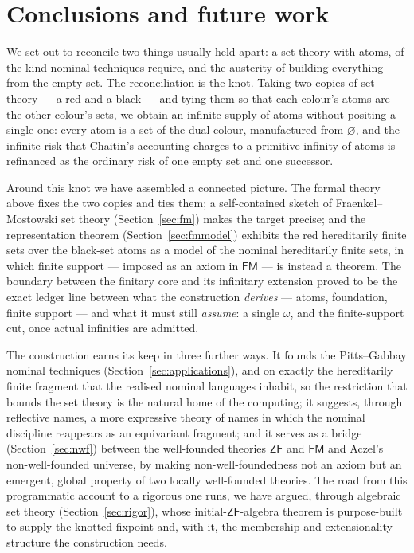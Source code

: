 
\section{Conclusions and future work}
\label{sec:conc}
\label{sec:future}

We set out to reconcile two things usually held apart: a set theory with atoms,
of the kind nominal techniques require, and the austerity of building everything
from the empty set. The reconciliation is the knot. Taking two copies of set
theory --- a {\rd red} and a {\bk black} --- and tying them so that each colour's
atoms are the other colour's sets, we obtain an infinite supply of atoms without
positing a single one: every atom is a set of the dual colour, manufactured from
$\varnothing$, and the infinite risk that Chaitin's accounting charges to a
primitive infinity of atoms is refinanced as the ordinary risk of one empty set
and one successor.

Around this knot we have assembled a connected picture. The formal theory above
fixes the two copies and ties them; a self-contained sketch of
Fraenkel--Mostowski set theory (Section~\ref{sec:fm}) makes the target precise;
and the representation theorem (Section~\ref{sec:fmmodel}) exhibits the red
hereditarily finite sets over the black-set atoms as a model of the nominal
hereditarily finite sets, in which finite support --- imposed as an axiom in
$\mathsf{FM}$ --- is instead a theorem. The boundary between the finitary core and
its infinitary extension proved to be the exact ledger line between what the
construction \emph{derives} --- atoms, foundation, finite support --- and what it
must still \emph{assume}: a single $\omega$, and the finite-support cut, once
actual infinities are admitted.

The construction earns its keep in three further ways. It founds the
Pitts--Gabbay nominal techniques (Section~\ref{sec:applications}), and on exactly
the hereditarily finite fragment that the realised nominal languages inhabit, so
the restriction that bounds the set theory is the natural home of the computing;
it suggests, through reflective names, a more expressive theory of names in which
the nominal discipline reappears as an equivariant fragment; and it serves as a
bridge (Section~\ref{sec:nwf}) between the well-founded theories $\mathsf{ZF}$ and
$\mathsf{FM}$ and Aczel's non-well-founded universe, by making
non-well-foundedness not an axiom but an emergent, global property of two locally
well-founded theories. The road from this programmatic account to a rigorous one
runs, we have argued, through algebraic set theory (Section~\ref{sec:rigor}),
whose initial-$\mathsf{ZF}$-algebra theorem is purpose-built to supply the knotted
fixpoint and, with it, the membership and extensionality structure the
construction needs.

